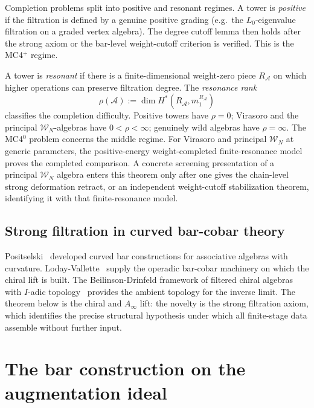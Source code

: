 \documentclass[11pt,reqno]{amsart}
\theoremstyle{definition}
\theoremstyle{remark}
\newcommand{\cA}{\mathcal{A}}
\newcommand{\cW}{\mathcal{W}}
\newcommand{\Ainf}{A_\infty}
\numberwithin{equation}{section}
\begin{document}
Completion problems split into positive and resonant regimes. A
tower is \emph{positive} if the
filtration is defined by a genuine positive grading (e.g.\ the
$L_0$-eigenvalue filtration on a graded vertex algebra). The
degree cutoff lemma then holds after the strong axiom or the
bar-level weight-cutoff criterion is verified. This is the
MC4${}^+$ regime.

A tower is \emph{resonant} if there is a finite-dimensional
weight-zero piece $R_\cA$ on which higher operations can
preserve filtration degree. The \emph{resonance rank}
\[
\rho(\cA) := \dim H^*(R_\cA, m_1^{R_\cA})
\]
classifies the completion difficulty. Positive towers have
$\rho = 0$; Virasoro and the principal $\cW_N$-algebras have
$0 < \rho < \infty$; genuinely wild algebras have
$\rho = \infty$. The MC4${}^0$ problem concerns the middle
regime. For Virasoro and principal $\cW_N$ at generic parameters,
the positive-energy weight-completed finite-resonance model proves
the completed comparison. A concrete screening presentation of a
principal $\cW_N$ algebra enters this theorem only after one gives
the chain-level strong deformation retract, or an independent
weight-cutoff stabilization theorem, identifying it with that
finite-resonance model.

\subsection{Strong filtration in curved bar-cobar theory}

Positselski~\cite{Positselski11} developed curved bar
constructions for associative algebras with curvature.
Loday-Vallette~\cite{LV12} supply the operadic bar-cobar
machinery on which the chiral lift is built. The
Beilinson-Drinfeld framework of filtered chiral algebras with
$I$-adic topology~\cite{BD04} provides the ambient topology
for the inverse limit. The theorem below is the chiral and
$\Ainf$ lift: the novelty is the strong filtration axiom,
which identifies the precise structural hypothesis under
which all finite-stage data assemble without further input.


\section{The bar construction on the augmentation ideal}
\label{sec:prelim}
\end{document}
